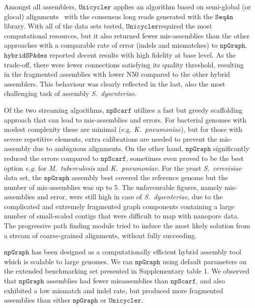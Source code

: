 \documentclass[10pt,letterpaper]{article}
\newcommand{\npscarf}{$\mathtt{npScarf}$}
\newcommand{\npgraph}{$\mathtt{npGraph}$}
\newcommand{\lrscaf}{$\mathtt{npGraph}$}
\newcommand{\unicycler}{$\mathtt{Unicycler}$}
\newcommand{\kp}{\emph{K.~pneumoniae}}
\newcommand{\EG}{\emph{e.g.}}
\begin{document}
Amongst all assemblers, \unicycler{} applies an algorithm based on semi-global (or glocal) alignments~\cite{Brudno2003glocal} with the consensus long reads generated with the $\mathtt{SeqAn}$ library. With all of the data sets tested, \unicycler required the most computational resources, but it also returned  fewer mis-assemblies than the other approaches with a comparable rate of error (indels and mismatches) to \npgraph{}.
$\mathtt{hybridSPAdes}$ reported decent results with high fidelity at base level. As the trade-off, there were fewer connections satisfying its quality threshold, resulting in the fragmented assemblies with lower N50 compared to the other hybrid assemblers. This behaviour was clearly reflected in the last, also the most challenging task of assembly \emph{S.~dysenteriae}.

Of the two streaming algorithms, \npscarf{} utilizes a fast but greedy scaffolding approach that can lead to mis-assemblies and errors.
For bacterial genomes with modest complexity these are minimal (e.g. \kp), but for those with severe repetitive elements, extra calibrations are needed to prevent the mis-assembly due to ambiguous alignments.
On the other hand, \npgraph{} significantly reduced the errors compared to \npscarf{}, sometimes even proved to be the best option \EG{} for \emph{M.~tuberculosis} and \kp{}.  
For the yeast \emph{S.~cerevisiae} data set, the \npgraph{} assembly best covered the reference genome but the number of mis-assemblies was up to 5.
The unfavourable figures, namely mis-assemblies and error, were still high in case of \emph{S.~dysenteriae}, 
 due to the complicated and extremely fragmented graph components containing a large number of small-scaled contigs that were difficult to map with nanopore data. The progressive path finding module tried to induce the most likely solution from a stream of coarse-grained alignments, without fully succeeding. 

\lrscaf{} has been designed as a computationally efficient hybrid assembly tool which is scalable to large genomes.  We ran \lrscaf{} using default parameters on the extended benchmarking set presented in Supplementary table 1.  We observed that  \lrscaf{} assemblies had fewer misassemblies than \npscarf{}, and also exhibited a low mismatch and indel rate, but produced more fragmented assemblies than either \npgraph{} or \unicycler{}.
\end{document}
